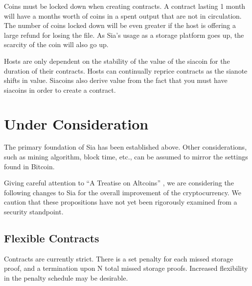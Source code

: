 \documentclass[twocolumn]{article}
\begin{document}
Coins must be locked down when creating contracts.
A contract lasting 1 month will have a months worth of coins in a spent output that are not in circulation.
The number of coins locked down will be even greater if the host is offering a large refund for losing the file.
As Sia's usage as a storage platform goes up, the scarcity of the coin will also go up.

Hosts are only dependent on the stability of the value of the siacoin for the duration of their contracts.
Hosts can continually reprice contracts as the sianote shifts in value.
Siacoins also derive value from the fact that you must have siacoins in order to create a contract.



\section{Under Consideration}
The primary foundation of Sia has been established above.
Other considerations, such as mining algorithm, block time, etc., can be assumed to mirror the settings found in Bitcoin.

Giving careful attention to ``A Treatise on Altcoins'' \cite{alts}, we are considering the following changes to Sia for the overall improvement of the cryptocurrency.
We caution that these propositions have not yet been rigorously examined from a security standpoint.

\subsection{Flexible Contracts}
Contracts are currently strict.
There is a set penalty for each missed storage proof, and a termination upon N total missed storage proofs.
Increased flexibility in the penalty schedule may be desirable.
\end{document}
